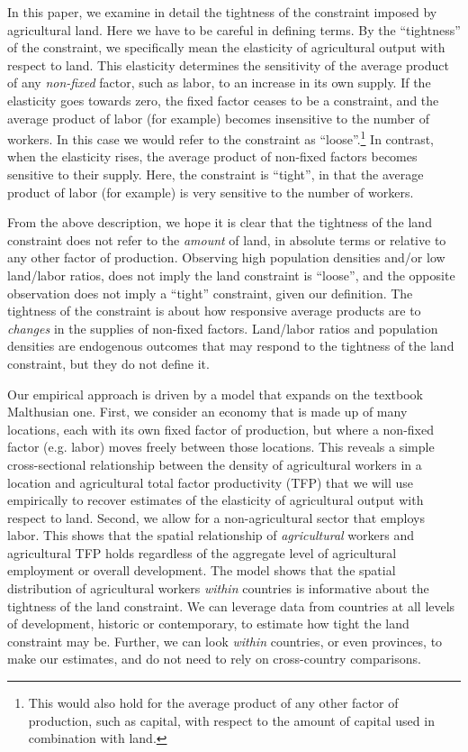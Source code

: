 \documentclass[11pt]{article}
\begin{document}
In this paper, we examine in detail the tightness of the constraint imposed by agricultural land. Here we have to be careful in defining terms. By the ``tightness'' of the constraint, we specifically mean the elasticity of agricultural output with respect to land. This elasticity determines the sensitivity of the average product of any \textit{non-fixed} factor, such as labor, to an increase in its own supply. If the elasticity goes towards zero, the fixed factor ceases to be a constraint, and the average product of labor (for example) becomes insensitive to the number of workers. In this case we would refer to the constraint as ``loose''.\footnote{This would also hold for the average product of any other factor of production, such as capital, with respect to the amount of capital used in combination with land.} In contrast, when the elasticity rises, the average product of non-fixed factors becomes sensitive to their supply. Here, the constraint is ``tight'', in that the average product of labor (for example) is very sensitive to the number of workers.

From the above description, we hope it is clear that the tightness of the land constraint does not refer to the \textit{amount} of land, in absolute terms or relative to any other factor of production. Observing high population densities and/or low land/labor ratios, does not imply the land constraint is ``loose'', and the opposite observation does not imply a ``tight'' constraint, given our definition. The tightness of the constraint is about how responsive average products are to \textit{changes} in the supplies of non-fixed factors. Land/labor ratios and population densities are endogenous outcomes that may respond to the tightness of the land constraint, but they do not define it.

Our empirical approach is driven by a model that expands on the textbook Malthusian one. First, we consider an economy that is made up of many locations, each with its own fixed factor of production, but where a non-fixed factor (e.g. labor) moves freely between those locations. This reveals a simple cross-sectional relationship between the density of agricultural workers in a location and agricultural total factor productivity (TFP) that we will use empirically to recover estimates of the elasticity of agricultural output with respect to land. Second, we allow for a non-agricultural sector that employs labor. This shows that the spatial relationship of \textit{agricultural} workers and agricultural TFP holds regardless of the aggregate level of agricultural employment or overall development. The model shows that the spatial distribution of agricultural workers \textit{within} countries is informative about the tightness of the land constraint. We can leverage data from countries at all levels of development, historic or contemporary, to estimate how tight the land constraint may be. Further, we can look \textit{within} countries, or even provinces, to make our estimates, and do not need to rely on cross-country comparisons.
\end{document}
